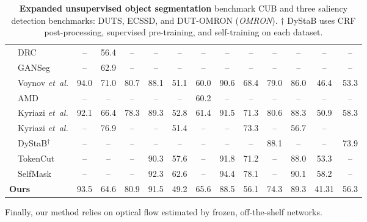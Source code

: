 \begin{table}[t]
\begin{center}
\begin{tabular}{@{}r@{\hspace{2pt}}lccc@{\hspace{10pt}}ccc@{\hspace{10pt}}ccc@{\hspace{10pt}}ccc}
{}\cite{yu2021unsupervised}        & DRC & --            & 56.4
& -- & -- & -- & -- & -- & -- & -- & -- & -- & -- \\
{}\cite{he2021ganseg}               & GANSeg       & --            & 62.9 & -- & -- & -- & -- & -- & -- & -- & -- & -- & -- \\       
{}\cite{voynov2021object}         & Voynov \emph{et~al.}                                                 & 94.0          & 71.0    & 80.7              & 88.1          & 51.1     & 60.0             & 90.6          & 68.4      & 79.0            & 86.0          & 46.4 & 53.3\\
{}\cite{liu2021emergence} & AMD & -- & -- & -- & -- & -- & 60.2 & -- & -- & -- & -- & -- & -- \\
{}\cite{melas-kyriazi2022finding}   & Kyriazi \emph{et~al.}                                            & 92.1          & 66.4      & 78.3            & 89.3          & 52.8      & 61.4            & 91.5 & 71.3    & 80.6     & 88.3          & 50.9 & 58.3\\
{}\cite{melas-kyriazi2022deep}   & Kyriazi \emph{et~al.}                                            & --          & 76.9       & --           & --          & 51.4          & --        & -- & 73.3         & --          & 56.7 & --\\
{}\cite{yang2021dystab} & DyStaB$^\dagger$ & -- & -- & -- & -- & -- & -- & -- & -- & 88.1 & -- & -- & 73.9 \\
{}\cite{wang2022selfsupervised} & TokenCut    & -- & -- & -- & 90.3 & 57.6 & -- & 91.8 & 71.2 & -- & 88.0 & 53.3 & -- \\
{}\cite{shin2022unsupervised} & SelfMask    & -- & -- & -- & 92.3 & 62.6 & -- & 94.4 & 78.1 & -- & 90.1 & 58.2 & -- \\
\midrule
\multicolumn{2}{l}{ \textbf{Ours}}                                            & 93.5 & 64.6 & 80.9     & 91.5 & 49.2 & 65.6  & 88.5 & 56.1 & 74.3                 & 89.3 & 41.31 & 56.3  \\
\bottomrule
\end{tabular}
\end{center}
\caption{\textbf{Expanded unsupervised object segmentation} benchmark CUB and three saliency detection benchmarks: DUTS, ECSSD, and DUT-OMRON (\textit{OMRON}). $\dagger$ DyStaB uses CRF post-processing, supervised pre-training, and self-training on each dataset.}
\label{table:unsup_semseg_expanded}
\end{table} 
Finally, our method relies on optical flow estimated by frozen, off-the-shelf networks.
